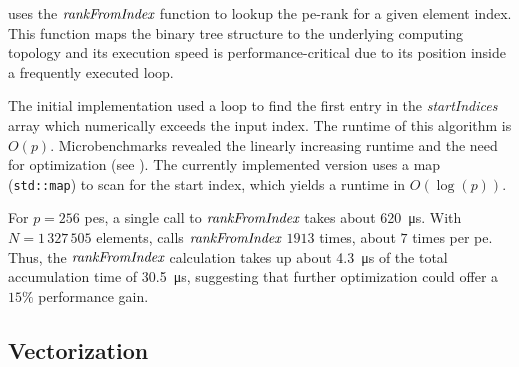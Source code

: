  uses the $\textit{rankFromIndex}$ function to lookup the \gls{pe}-rank for a given element index.
This function maps the binary tree structure to the underlying computing topology and its execution speed is performance-critical due to its position inside a frequently executed loop.

The initial implementation used a loop to find the first entry in the \textit{startIndices} array which numerically exceeds the input index.
The runtime of this algorithm is $O(p)$.
Microbenchmarks revealed the linearly increasing runtime and the need for optimization (see ).
The currently implemented version uses a map (\texttt{std::map}) to scan for the start index, which yields a runtime in $O(\log(p))$.

For $p=256$ \glspl{pe}, a single call to $\textit{rankFromIndex}$ takes about \SI{620}{\micro\second}.
With $N = 1\,327\,505$ elements,  calls $\textit{rankFromIndex}$ $1913$ times, about $7$ times per \gls{pe}.
Thus, the $\textit{rankFromIndex}$ calculation takes up about \SI{4.3}{\micro\second} of the total accumulation time of \SI{30.5}{\micro\second}, suggesting that further optimization could offer a $15\%$ performance gain.
\subsection{Vectorization}
\label{sec:Vectorization}


